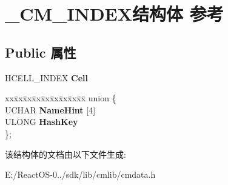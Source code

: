 \hypertarget{struct___c_m___i_n_d_e_x}{}\section{\+\_\+\+C\+M\+\_\+\+I\+N\+D\+E\+X结构体 参考}
\label{struct___c_m___i_n_d_e_x}
\subsection*{Public 属性}
\begin{DoxyCompactItemize}
\item 
\mbox{\label{struct___c_m___i_n_d_e_x_acd0cdb589a5ba2f702af1eac9968b7b8}} 
H\+C\+E\+L\+L\+\_\+\+I\+N\+D\+EX {\bfseries Cell}
\item 
\mbox{\label{struct___c_m___i_n_d_e_x_ad5bb6dacf41b60a53a0b0ffcd57ba549}} 
\begin{tabbing}
xx\=xx\=xx\=xx\=xx\=xx\=xx\=xx\=xx\=\kill
union \{\\
\>UCHAR {\bfseries NameHint} \mbox{[}4\mbox{]}\\
\>ULONG {\bfseries HashKey}\\
\}; \\

\end{tabbing}\end{DoxyCompactItemize}


该结构体的文档由以下文件生成\+:\begin{DoxyCompactItemize}
\item 
E\+:/\+React\+O\+S-\/0../sdk/lib/cmlib/cmdata.\+h\end{DoxyCompactItemize}
